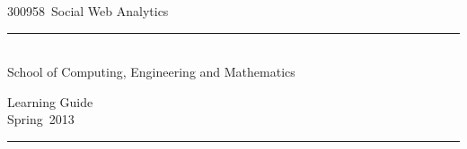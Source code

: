 \documentclass[a4paper,oneside]{book}
\newcommand{\unitcode}{300958}
\newcommand{\unitname}{Social Web Analytics}
\newcommand{\teachingsession}{Spring}
\newcommand{\teachingyear}{2013}
\newcommand{\HRule}{\rule{\linewidth}{0.2mm}}
\begin{document}
\begin{titlepage}
 
\begin{flushright}
\end{flushright}
\vspace{2em}
{\huge \unitcode~\unitname} \\
\HRule \\[1em]
{\Large School of Computing, Engineering and Mathematics}%
\begin{center}
\end{center} %
\vspace{1em}
\begin{flushright}
{\Huge  Learning Guide} \\[1em]
{\Huge \teachingsession~\teachingyear} \\[1em]
\end{flushright}
\vfill
\noindent
\HRule
 
\end{titlepage}
\end{document}
